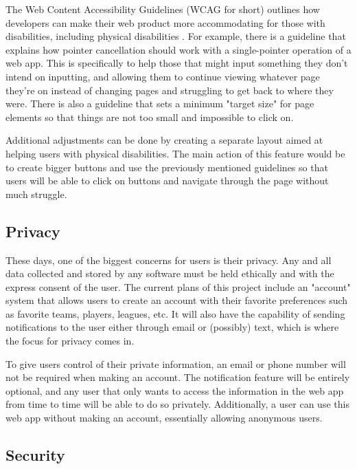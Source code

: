 \documentclass[10pt,twocolumn]{article}
\begin{document}
The Web Content Accessibility Guidelines (WCAG for short) outlines how developers can make their web product more accommodating for those with disabilities, including physical disabilities \cite{WCAG2point1}.
For example, there is a guideline that explains how pointer cancellation should work with a single-pointer operation of a web app. %
This is specifically to help those that might input something they don't intend on inputting, and allowing them to continue viewing whatever page they're on instead of changing pages and struggling to get back to where they were.
There is also a guideline that sets a minimum "target size" for page elements so that things are not too small and impossible to click on. %

Additional adjustments can be done by creating a separate layout aimed at helping users with physical disabilities. The main action of this feature would be to create bigger buttons and use the previously mentioned guidelines so that users will be able to click on buttons and navigate through the page without much struggle. 

\subsection{Privacy}

These days, one of the biggest concerns for users is their privacy.
Any and all data collected and stored by any software must be held ethically and with the express consent of the user.
The current plans of this project include an "account" system that allows users to create an account with their favorite preferences such as favorite teams, players, leagues, etc.
It will also have the capability of sending notifications to the user either through email or (possibly) text, which is where the focus for privacy comes in.

To give users control of their private information, an email or phone number will not be required when making an account.
The notification feature will be entirely optional, and any user that only wants to access the information in the web app from time to time will be able to do so privately.
Additionally, a user can use this web app without making an account, essentially allowing anonymous users.

\subsection{Security}
\end{document}
